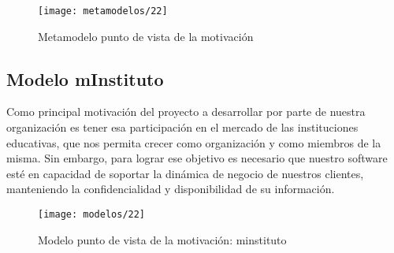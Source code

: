    \begin{figure}[H]
   	\centering
   	\texttt{[image: metamodelos/22]}
   	\captionsetup{width=.95\textwidth}
   	\caption{Metamodelo punto de vista de la motivación \cite{ref9}}
   	\label{metamodelo22}
   \end{figure}
   
   \subsection{Modelo mInstituto}
   Como principal motivación del proyecto a desarrollar por parte de nuestra organización es tener esa participación en el mercado de las instituciones educativas, que nos permita crecer como organización y como miembros de la misma. Sin embargo, para lograr ese objetivo es necesario que nuestro software esté en capacidad de soportar la dinámica de negocio de nuestros clientes, manteniendo la confidencialidad y disponibilidad de su información.
   
   \begin{figure}[H]
   	\centering
   	\texttt{[image: modelos/22]}
   	\captionsetup{width=.95\textwidth}
   	\caption{Modelo punto de vista de la motivación: minstituto}
   	\label{modelo22}
   \end{figure}